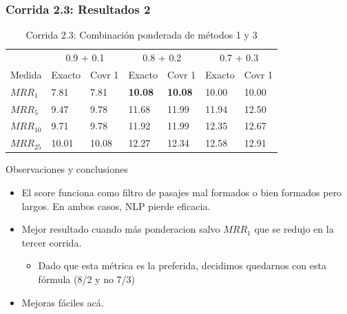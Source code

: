 \begin{frame}
\frametitle{Corrida 2.3: Resultados 2}

\begin{table}
\centering
\begin{center}
\begin{tabular}{|l | l | l | l | l | l | l |}

& \multicolumn{2}{|c|}{0.9 + 0.1} &
  \multicolumn{2}{|c|}{0.8 + 0.2} &
  \multicolumn{2}{|c|}{0.7 + 0.3} \\ 
Medida & Exacto & Covr 1 & Exacto & Covr 1 & Exacto & Covr 1 \\ 
$MRR_{1}$ & 7.81 & 7.81 & \textbf{10.08} & \textbf{10.08} & 10.00 & 10.00  \\ 
$MRR_{5}$ & 9.47 & 9.78 & 11.68 & 11.99 & 11.94 & 12.50  \\ 
$MRR_{10}$ & 9.71 & 9.78 & 11.92 & 11.99 & 12.35 & 12.67  \\ 
$MRR_{25}$ & 10.01 & 10.08 & 12.27 & 12.34 & 12.58 & 12.91  \\ 
\end{tabular}
\caption{Corrida 2.3: Combinación ponderada de métodos 1 y 3}
\end{center}
\end{table}


Observaciones y conclusiones
\begin{itemize}
  \item El score funciona como filtro de pasajes mal formados o bien formados pero largos. En ambos casos, NLP pierde eficacia.
  \item Mejor resultado cuando más ponderacion salvo $MRR_1$ que se redujo en la tercer corrida. 
  \begin{itemize}
    \item Dado que esta métrica es la preferida, decidimos quedarnos con esta fórmula (8/2 y no 7/3)
    \end{itemize}
  \item Mejoras fáciles acá.
  \end{itemize}

\end{frame}




